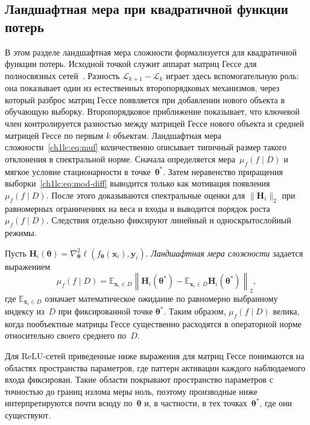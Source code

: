\subsection{Ландшафтная мера при квадратичной функции потерь}\label{ch1lc:sec:landscape}

В этом разделе ландшафтная мера сложности формализуется для квадратичной функции потерь. Исходной точкой служит аппарат матриц Гессе для полносвязных сетей~\cite{grabovoi2024unraveling748584228}.
Разность $\mathcal{L}_{k+1}-\mathcal{L}_k$ играет здесь вспомогательную роль: она показывает один из естественных второпорядковых механизмов, через который разброс матриц Гессе появляется при добавлении нового объекта в обучающую выборку.
Второпорядковое приближение показывает, что ключевой член контролируется разностью между матрицей Гессе нового объекта и средней матрицей Гессе по первым $k$ объектам. Ландшафтная мера сложности~\eqref{ch1lc:eq:muf} количественно описывает типичный размер такого отклонения в спектральной норме.
Сначала определяется мера~$\mu_f(f\mid D)$ и мягкое условие стационарности в точке~$\boldsymbol{\theta}^*$. Затем неравенство приращения выборки~\eqref{ch1lc:eq:mod-diff} выводится только как мотивация появления~$\mu_f(f\mid D)$. После этого доказываются спектральные оценки для $\|\mathbf{H}_i\|_2$ при равномерных ограничениях на веса и входы и выводится порядок роста~$\mu_f(f\mid D)$.
Следствия отдельно фиксируют линейный и односкрытослойный режимы.

\begin{definition}\label{ch1lc:def:muf}
Пусть $\mathbf{H}_i(\boldsymbol{\theta}) = \nabla^2_{\boldsymbol{\theta}} \ell(f_{\boldsymbol{\theta}}(\mathbf{x}_i),\mathbf{y}_i)$.
\emph{Ландшафтная мера сложности} задается выражением
\begin{equation}\label{ch1lc:eq:muf}
  \mu_f(f\mid D)
  = \mathbb{E}_{\mathbf{x}_i\in D}\left\|
      \mathbf{H}_{i}(\boldsymbol{\theta}^*)
      - \mathbb{E}_{\mathbf{x}_i\in D}\mathbf{H}_{i}(\boldsymbol{\theta}^*)
    \right\|_2 ,
\end{equation}
где $\mathbb{E}_{\mathbf{x}_i\in D}$ означает математическое ожидание по равномерно выбранному индексу из~$D$ при фиксированной точке $\boldsymbol{\theta}^*$.
Таким образом, $\mu_f(f\mid D)$ велика, когда пообъектные матрицы Гессе существенно расходятся в операторной норме относительно своего среднего по~$D$.
\end{definition}
\noindent
Для ReLU-сетей приведенные ниже выражения для матриц Гессе понимаются на областях пространства параметров, где паттерн активации каждого наблюдаемого входа фиксирован. Такие области покрывают пространство параметров с точностью до границ излома меры ноль, поэтому производные ниже интерпретируются почти всюду по~$\boldsymbol{\theta}$ и, в частности, в тех точках~$\boldsymbol{\theta}^*$, где они существуют.

